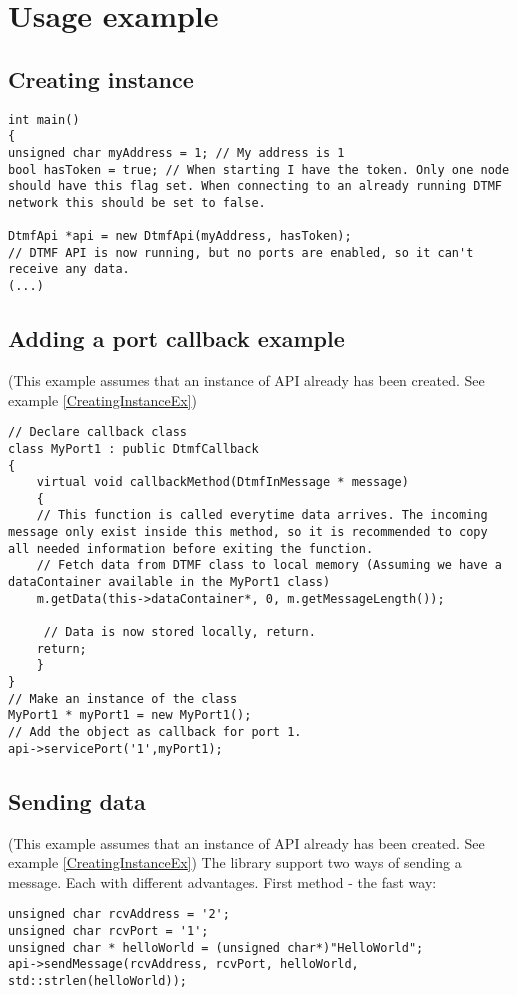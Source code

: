 \chapter{Usage example}
\label{app:usageexample}
\section{Creating instance}
\begin{lstlisting}[float=htb,language={[ANSI]C++},caption={Creating instance example},label=CreatingInstanceEx]
int main()
{
unsigned char myAddress = 1; // My address is 1
bool hasToken = true; // When starting I have the token. Only one node should have this flag set. When connecting to an already running DTMF network this should be set to false.

DtmfApi *api = new DtmfApi(myAddress, hasToken);
// DTMF API is now running, but no ports are enabled, so it can't receive any data.
(...)
\end{lstlisting}

\section{Adding a port callback example}
(This example assumes that an instance of API already has been created. See example \ref{CreatingInstanceEx})
\begin{lstlisting}[float=htb,language={[ANSI]C++},caption={Adding a port callback example},label=CreatingCallbackEx]
// Declare callback class
class MyPort1 : public DtmfCallback
{
	virtual void callbackMethod(DtmfInMessage * message)
	{
    // This function is called everytime data arrives. The incoming message only exist inside this method, so it is recommended to copy all needed information before exiting the function.
    // Fetch data from DTMF class to local memory (Assuming we have a dataContainer available in the MyPort1 class)
    m.getData(this->dataContainer*, 0, m.getMessageLength());
    
     // Data is now stored locally, return.
    return;
	}
}
// Make an instance of the class
MyPort1 * myPort1 = new MyPort1();
// Add the object as callback for port 1.
api->servicePort('1',myPort1);
\end{lstlisting}


\section{Sending data}
(This example assumes that an instance of API already has been created. See example \ref{CreatingInstanceEx})
The library support two ways of sending a message. Each with different advantages.
First method - the fast way:
\begin{lstlisting}[float=htb,language={[ANSI]C++},caption={Sending data example 1},label=SendingDataEx1]
unsigned char rcvAddress = '2';
unsigned char rcvPort = '1';
unsigned char * helloWorld = (unsigned char*)"HelloWorld";
api->sendMessage(rcvAddress, rcvPort, helloWorld, std::strlen(helloWorld));
\end{lstlisting}

